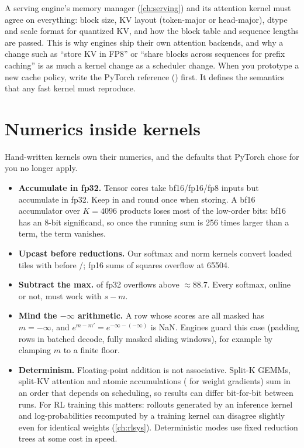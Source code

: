 \begin{systemslens}
A serving engine's memory manager (\cref{ch:serving}) and its attention kernel must agree
on everything: block size, KV layout (token-major or head-major), dtype and scale
format for quantized KV, and how the block table and sequence lengths are passed. This is
why engines ship their own attention backends, and why a change such as ``store KV in
FP8'' or ``share blocks across sequences for prefix caching'' is as much a kernel change
as a scheduler change. When you prototype a new cache policy, write the PyTorch
reference () first. It defines the semantics
that any fast kernel must reproduce.
\end{systemslens}

\section{Numerics inside kernels}\label{sec:triton:numerics}
Hand-written kernels own their numerics, and the defaults that PyTorch chose for you no
longer apply.
\begin{itemize}
  \item \textbf{Accumulate in fp32.} Tensor cores take bf16/fp16/fp8 inputs but accumulate in
        fp32. Keep  in  and round once when storing. A bf16
        accumulator over $K=4096$ products loses most of the low-order bits: bf16 has an
        8-bit significand, so once the running sum is 256 times larger than a term, the
        term vanishes.
  \item \textbf{Upcast before reductions.} Our softmax and norm kernels convert loaded tiles
        with  before /; fp16 sums of
        squares overflow at 65504.
  \item \textbf{Subtract the max.}  of fp32 overflows above $\approx88.7$.
        Every softmax, online or not, must work with $s-m$.
  \item \textbf{Mind the $-\infty$ arithmetic.} A row whose scores are all masked has
        $m=-\infty$, and $e^{m-m'}=e^{-\infty-(-\infty)}$ is NaN. Engines guard this case
        (padding rows in batched decode, fully masked sliding windows), for example by
        clamping $m$ to a finite floor.
  \item \textbf{Determinism.} Floating-point addition is not associative. Split-K GEMMs,
        split-KV attention and atomic accumulations ( for weight
        gradients) sum in an order that depends on scheduling, so results can differ
        bit-for-bit between runs. For RL training this matters: rollouts generated by an
        inference kernel and log-probabilities recomputed by a training kernel can
        disagree slightly even for identical weights (\cref{ch:rlsys}). Deterministic
        modes use fixed reduction trees at some cost in speed.
\end{itemize}

